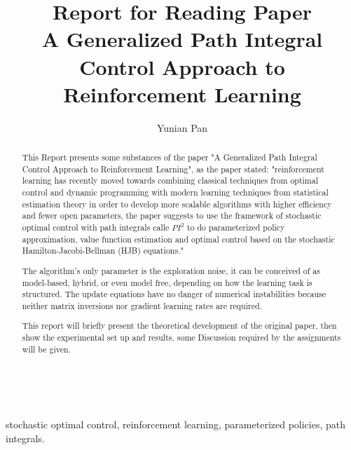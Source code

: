 \documentclass[journal]{IEEEtran}
\begin{document}
\title{Report for Reading Paper\\ A Generalized Path Integral Control Approach to Reinforcement Learning}





\author{Yunian Pan}




\maketitle

\begin{abstract}

This Report presents some substances of the paper "A Generalized Path Integral Control Approach to Reinforcement Learning", as the paper stated: "reinforcement learning has recently moved towards
combining classical techniques from optimal control and dynamic programming with modern learning techniques from statistical estimation theory in order to develop more scalable algorithms
with higher efficiency and fewer open parameters, the paper suggests to use the framework of stochastic optimal control with path integrals calle $PI^2$ to do parameterized policy approximation,  
 value function estimation and optimal control based on the stochastic Hamilton-Jacobi-Bellman (HJB) equations."
 
The algorithm's only parameter is the exploration noise, it can be conceived of as model-based, hybrid, or even model free,
depending on how the learning task is structured. 
The update equations have no danger of
numerical instabilities because neither matrix inversions nor gradient learning rates are required. 

This report will briefly present the theoretical development of the original paper, then show the experimental set up and results, some Discussion
required by the assignments will be given.



\end{abstract}
\ \\
\begin{IEEEkeywords}
stochastic optimal control, reinforcement learning, parameterized policies, path integrals.
\end{IEEEkeywords}
\end{document}
